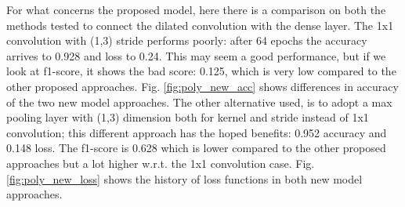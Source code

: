 \documentclass{article}
\begin{document}
For what concerns the proposed model, here there is a comparison on both the methods tested to connect the dilated convolution with the dense layer. The 1x1 convolution with (1,3) stride performs poorly: after 64 epochs the accuracy arrives to 0.928 and loss to 0.24. This may seem a good performance, but if we look at f1-score, it shows the bad score: 0.125, which is very low compared to the other proposed approaches. Fig. \ref{fig:poly_new_acc} shows differences in accuracy of the two new model approaches. \newline
The other alternative used, is to adopt a  max pooling layer with (1,3) dimension both for kernel and stride instead of 1x1 convolution; this different approach has the hoped benefits: 0.952 accuracy and 0.148 loss. The f1-score is 0.628 which is lower compared to the other proposed approaches but a lot higher w.r.t. the 1x1 convolution case. Fig. \ref{fig:poly_new_loss} shows the history of loss functions in both new model approaches.
\end{document}
